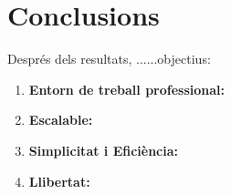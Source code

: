 \chapter{Conclusions}
\label{c:conclusions}
Després dels resultats, ......objectius:
\begin{enumerate}
     \item \textbf{Entorn de treball professional: }
     \item \textbf{Escalable: }
     \item \textbf{Simplicitat i Eficiència: }
     \item \textbf{Llibertat: }
\end{enumerate}



